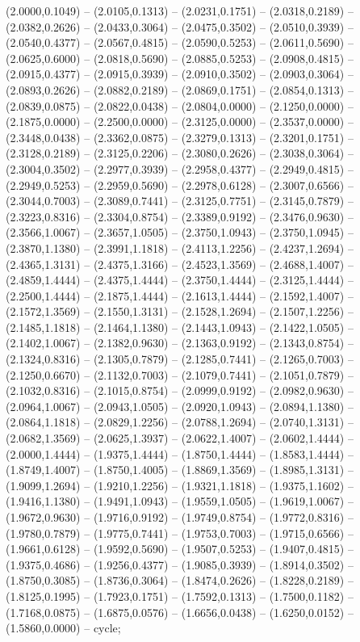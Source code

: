 {(2.0000,0.1049) -- (2.0105,0.1313) -- (2.0231,0.1751) -- (2.0318,0.2189) -- (2.0382,0.2626) -- (2.0433,0.3064) -- (2.0475,0.3502) -- (2.0510,0.3939) -- (2.0540,0.4377) -- (2.0567,0.4815) -- (2.0590,0.5253) -- (2.0611,0.5690) -- (2.0625,0.6000) -- (2.0818,0.5690) -- (2.0885,0.5253) -- (2.0908,0.4815) -- (2.0915,0.4377) -- (2.0915,0.3939) -- (2.0910,0.3502) -- (2.0903,0.3064) -- (2.0893,0.2626) -- (2.0882,0.2189) -- (2.0869,0.1751) -- (2.0854,0.1313) -- (2.0839,0.0875) -- (2.0822,0.0438) -- (2.0804,0.0000) -- (2.1250,0.0000) -- (2.1875,0.0000) -- (2.2500,0.0000) -- (2.3125,0.0000) -- (2.3537,0.0000) -- (2.3448,0.0438) -- (2.3362,0.0875) -- (2.3279,0.1313) -- (2.3201,0.1751) -- (2.3128,0.2189) -- (2.3125,0.2206) -- (2.3080,0.2626) -- (2.3038,0.3064) -- (2.3004,0.3502) -- (2.2977,0.3939) -- (2.2958,0.4377) -- (2.2949,0.4815) -- (2.2949,0.5253) -- (2.2959,0.5690) -- (2.2978,0.6128) -- (2.3007,0.6566) -- (2.3044,0.7003) -- (2.3089,0.7441) -- (2.3125,0.7751) -- (2.3145,0.7879) -- (2.3223,0.8316) -- (2.3304,0.8754) -- (2.3389,0.9192) -- (2.3476,0.9630) -- (2.3566,1.0067) -- (2.3657,1.0505) -- (2.3750,1.0943) -- (2.3750,1.0945) -- (2.3870,1.1380) -- (2.3991,1.1818) -- (2.4113,1.2256) -- (2.4237,1.2694) -- (2.4365,1.3131) -- (2.4375,1.3166) -- (2.4523,1.3569) -- (2.4688,1.4007) -- (2.4859,1.4444) -- (2.4375,1.4444) -- (2.3750,1.4444) -- (2.3125,1.4444) -- (2.2500,1.4444) -- (2.1875,1.4444) -- (2.1613,1.4444) -- (2.1592,1.4007) -- (2.1572,1.3569) -- (2.1550,1.3131) -- (2.1528,1.2694) -- (2.1507,1.2256) -- (2.1485,1.1818) -- (2.1464,1.1380) -- (2.1443,1.0943) -- (2.1422,1.0505) -- (2.1402,1.0067) -- (2.1382,0.9630) -- (2.1363,0.9192) -- (2.1343,0.8754) -- (2.1324,0.8316) -- (2.1305,0.7879) -- (2.1285,0.7441) -- (2.1265,0.7003) -- (2.1250,0.6670) -- (2.1132,0.7003) -- (2.1079,0.7441) -- (2.1051,0.7879) -- (2.1032,0.8316) -- (2.1015,0.8754) -- (2.0999,0.9192) -- (2.0982,0.9630) -- (2.0964,1.0067) -- (2.0943,1.0505) -- (2.0920,1.0943) -- (2.0894,1.1380) -- (2.0864,1.1818) -- (2.0829,1.2256) -- (2.0788,1.2694) -- (2.0740,1.3131) -- (2.0682,1.3569) -- (2.0625,1.3937) -- (2.0622,1.4007) -- (2.0602,1.4444) -- (2.0000,1.4444) -- (1.9375,1.4444) -- (1.8750,1.4444) -- (1.8583,1.4444) -- (1.8749,1.4007) -- (1.8750,1.4005) -- (1.8869,1.3569) -- (1.8985,1.3131) -- (1.9099,1.2694) -- (1.9210,1.2256) -- (1.9321,1.1818) -- (1.9375,1.1602) -- (1.9416,1.1380) -- (1.9491,1.0943) -- (1.9559,1.0505) -- (1.9619,1.0067) -- (1.9672,0.9630) -- (1.9716,0.9192) -- (1.9749,0.8754) -- (1.9772,0.8316) -- (1.9780,0.7879) -- (1.9775,0.7441) -- (1.9753,0.7003) -- (1.9715,0.6566) -- (1.9661,0.6128) -- (1.9592,0.5690) -- (1.9507,0.5253) -- (1.9407,0.4815) -- (1.9375,0.4686) -- (1.9256,0.4377) -- (1.9085,0.3939) -- (1.8914,0.3502) -- (1.8750,0.3085) -- (1.8736,0.3064) -- (1.8474,0.2626) -- (1.8228,0.2189) -- (1.8125,0.1995) -- (1.7923,0.1751) -- (1.7592,0.1313) -- (1.7500,0.1182) -- (1.7168,0.0875) -- (1.6875,0.0576) -- (1.6656,0.0438) -- (1.6250,0.0152) -- (1.5860,0.0000) -- cycle;
}
